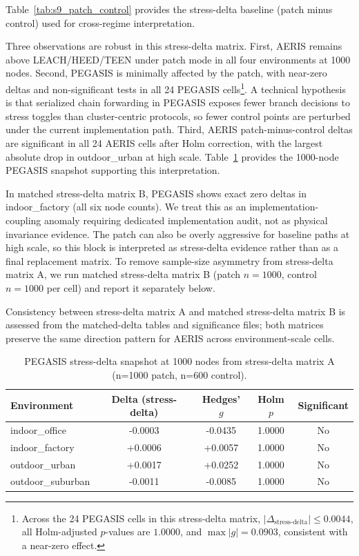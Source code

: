 ﻿\documentclass[sensors,article,submit,moreauthors,pdftex]{Definitions/mdpi}
\begin{document}
Table~\ref{tab:s9_patch_control} provides the stress-delta baseline (patch minus control) used for cross-regime interpretation.

Three observations are robust in this stress-delta matrix. First, AERIS remains above LEACH/HEED/TEEN under patch mode in all four environments at 1000 nodes. Second, PEGASIS is minimally affected by the patch, with near-zero deltas and non-significant tests in all 24 PEGASIS cells\footnote{Across the 24 PEGASIS cells in this stress-delta matrix, \(|\Delta_{\text{stress-delta}}| \le 0.0044\), all Holm-adjusted \(p\)-values are \(1.0000\), and \(\max |g| = 0.0903\), consistent with a near-zero effect.}. A technical hypothesis is that serialized chain forwarding in PEGASIS exposes fewer branch decisions to stress toggles than cluster-centric protocols, so fewer control points are perturbed under the current implementation path. Third, AERIS patch-minus-control deltas are significant in all 24 AERIS cells after Holm correction, with the largest absolute drop in outdoor\_urban at high scale. Table~\ref{tab:s9_pegasis_1000} provides the 1000-node PEGASIS snapshot supporting this interpretation.

In matched stress-delta matrix B, PEGASIS shows exact zero deltas in indoor\_factory (all six node counts). We treat this as an implementation-coupling anomaly requiring dedicated implementation audit, not as physical invariance evidence. The patch can also be overly aggressive for baseline paths at high scale, so this block is interpreted as stress-delta evidence rather than as a final replacement matrix. To remove sample-size asymmetry from stress-delta matrix A, we run matched stress-delta matrix B (patch \(n=1000\), control \(n=1000\) per cell) and report it separately below.

Consistency between stress-delta matrix A and matched stress-delta matrix B is assessed from the matched-delta tables and significance files; both matrices preserve the same direction pattern for AERIS across environment-scale cells.

\begin{table}[H]
\caption{PEGASIS stress-delta snapshot at 1000 nodes from stress-delta matrix A (n=1000 patch, n=600 control).}
\label{tab:s9_pegasis_1000}
\centering
\begin{tabular}{lcccc}
\toprule
Environment & Delta (stress-delta) & Hedges' $g$ & Holm $p$ & Significant \\
\midrule
indoor\_office    & -0.0003 & -0.0435 & 1.0000 & No \\
indoor\_factory   & +0.0006 & +0.0057 & 1.0000 & No \\
outdoor\_urban    & +0.0017 & +0.0252 & 1.0000 & No \\
outdoor\_suburban & -0.0011 & -0.0085 & 1.0000 & No \\
\bottomrule
\end{tabular}
\end{table}
\end{document}
